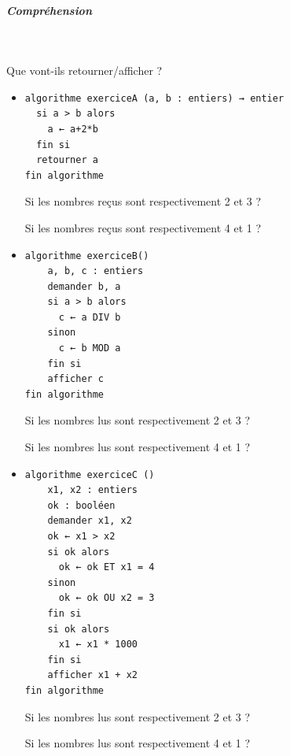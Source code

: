 \documentclass[11pt,a4paper]{article}
\begin{document}
			
		\subparagraph{Compr\'ehension} 
		
                \textcolor{white}{.} \par
            
							  Que vont-ils retourner/afficher ?
              
					\begin{itemize}
				
			\item \begin{verbatim}
algorithme exerciceA (a, b : entiers) → entier
  si a > b alors
    a ← a+2*b
  fin si
  retourner a
fin algorithme
				\end{verbatim}Si les nombres re\c cus sont respectivement 2 et 3 ? 
            \par
         \textcolor{gray}{\underline{\hspace*{1em}}} Si les nombres re\c cus sont respectivement 4 et 1 ? 
            \par
         \textcolor{gray}{\underline{\hspace*{1em}}} 
			\item \begin{verbatim}
algorithme exerciceB()
    a, b, c : entiers
    demander b, a
    si a > b alors
      c ← a DIV b
    sinon
      c ← b MOD a
    fin si
    afficher c
fin algorithme
				\end{verbatim}Si les nombres lus sont respectivement 2 et 3 ? 
            \par
         \textcolor{gray}{\underline{\hspace*{1em}}} Si les nombres lus sont respectivement 4 et 1 ? 
            \par
         \textcolor{gray}{\underline{\hspace*{1em}}} 
			\item \begin{verbatim}
algorithme exerciceC ()
    x1, x2 : entiers
    ok : booléen
    demander x1, x2
    ok ← x1 > x2
    si ok alors
      ok ← ok ET x1 = 4
    sinon
      ok ← ok OU x2 = 3
    fin si
    si ok alors
      x1 ← x1 * 1000
    fin si
    afficher x1 + x2
fin algorithme
				\end{verbatim}Si les nombres lus sont respectivement 2 et 3 ? 
            \par
         \textcolor{gray}{\underline{\hspace*{3em}}} Si les nombres lus sont respectivement 4 et 1 ? 
            \par
         \textcolor{gray}{\underline{\hspace*{3em}}} 
					\end{itemize}
				
\end{document}
